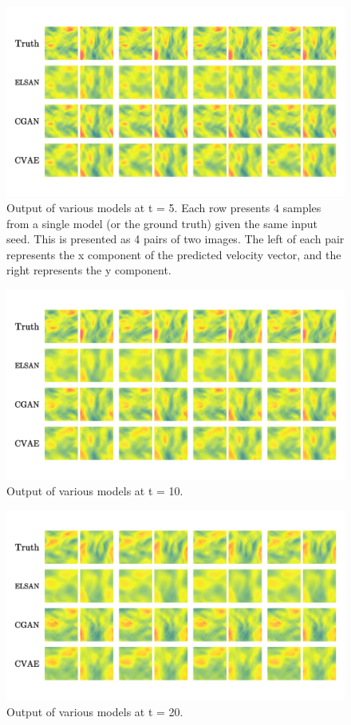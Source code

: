 \documentclass{article}
\begin{document}
\begin{figure}
    \centering
    \includegraphics[width=\textwidth]{t=5}
    \caption{Output of various models at t = 5. Each row presents $4$ samples from a single model (or the ground truth) given the same input seed. This is presented as 4 pairs of two images. The left of each pair represents the x component of the predicted velocity vector, and the right represents the y component. }
    \label{t=5}
\end{figure}

\begin{figure}
    \centering
    \includegraphics[width=\textwidth]{t=10}
    \caption{Output of various models at t = 10.}
    \label{t=10}
\end{figure}

\begin{figure}
    \centering
    \includegraphics[width=\textwidth]{t=20}
    \caption{Output of various models at t = 20.}
    \label{t=20}
\end{figure}
\end{document}
